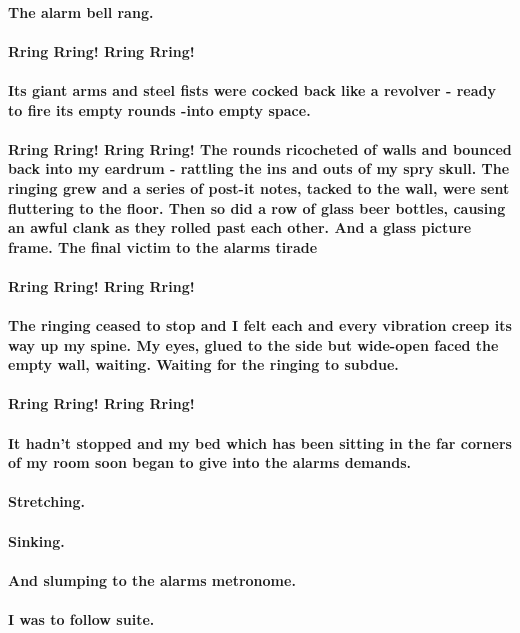 \documentclass{book}
\begin{document}
\paragraph{The alarm bell rang.\\\\Rring Rring! Rring Rring!\\\\Its giant arms and steel fists were cocked back like a revolver - ready to fire its empty rounds -into empty space.\\\\Rring Rring! Rring Rring! The rounds ricocheted of walls and bounced back into my eardrum - rattling the ins and outs of my spry skull. The ringing grew and a series of post-it notes, tacked to the wall, were sent fluttering to the floor. Then so did a row of glass beer bottles, causing an awful clank as they rolled past each other. And a glass picture frame. The final victim to the alarms tirade\\\\Rring Rring! Rring Rring!\\\\The ringing ceased to stop and I felt each and every vibration creep its way up my spine. My eyes, glued to the side but wide-open faced the empty wall, waiting. Waiting for the ringing to subdue.\\\\Rring Rring! Rring Rring!\\\\It hadn't stopped and my bed which has been sitting in the far corners of my room soon began to give into the alarms demands.\\\\Stretching.\\\\Sinking.\\\\And slumping to the alarms metronome.\\\\I was to follow suite.}


\end{document}
